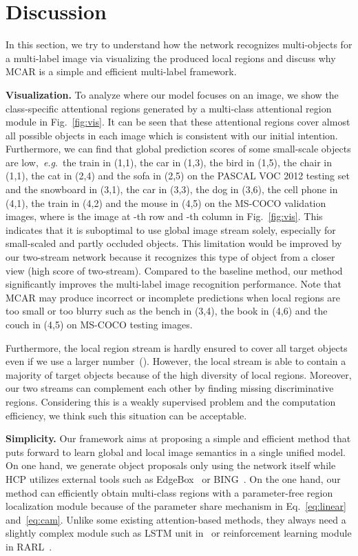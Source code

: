 \documentclass[journal]{IEEEtran}
\makeatletter
\DeclareRobustCommand\onedot{\@onedot}
\def\@onedot{.}
\def\eg{\emph{e.g}\onedot}
\makeatother
\begin{document}
\section{Discussion}\label{discuss}
In this section, we try to understand how the network recognizes multi-objects for a multi-label image via visualizing the produced local regions and discuss why MCAR is a simple and efficient multi-label framework. 

\noindent \textbf{Visualization.} 
To analyze where our model focuses on an image, we show the class-specific attentional regions generated by a multi-class attentional region module in Fig.~\ref{fig:vis}. It can be seen that these attentional regions cover almost all possible objects in each image which is consistent with our initial intention. Furthermore, we can find that global prediction scores of some small-scale objects are low,~\eg~the train in (1,1), the car in (1,3), the bird in (1,5), the chair in (1,1), the cat in (2,4) and the sofa in (2,5) on the PASCAL VOC 2012 testing set and the snowboard in (3,1), the car in (3,3), the dog in (3,6), the cell phone in (4,1), the train in (4,2) and the mouse in (4,5) on the MS-COCO validation images, where  is the image at -th row and -th column in Fig.~\ref{fig:vis}. This indicates that it is suboptimal to use global image stream solely, especially for small-scaled and partly occluded objects. This limitation would be improved by our two-stream network because it recognizes this type of object from a closer view (high score of two-stream). Compared to the baseline method, our method significantly improves the multi-label image recognition performance. Note that MCAR may produce incorrect or incomplete predictions when local regions are too small or too blurry such as the bench in (3,4), the book in (4,6) and the couch in (4,5) on MS-COCO testing images.

Furthermore, the local region stream is hardly ensured to cover all target objects even if we use a larger number~(). However, the local stream is able to contain a majority of target objects because of the high diversity of local regions. Moreover, our two streams can complement each other by finding missing discriminative regions. Considering this is a weakly supervised problem and the computation efficiency, we think such this situation can be acceptable.

\noindent \textbf{Simplicity.} 
Our framework aims at proposing a simple and efficient method that puts forward to learn global and local image semantics in a single unified model. 
On one hand, we generate object proposals only using the network itself while HCP utilizes external tools such as EdgeBox~\cite{zitnick2014edge} or BING~\cite{cheng2014bing}. On the one hand, our method can efficiently obtain multi-class regions with a parameter-free region localization module because of the parameter share mechanism in Eq.~\ref{eq:linear} and~\ref{eq:cam}. Unlike some existing attention-based methods, they always need a slightly complex module such as LSTM unit in~\cite{jaderberg2015spatial,yu2019delta} or reinforcement learning module in RARL~\cite{chen2018recurrent}.
\end{document}
